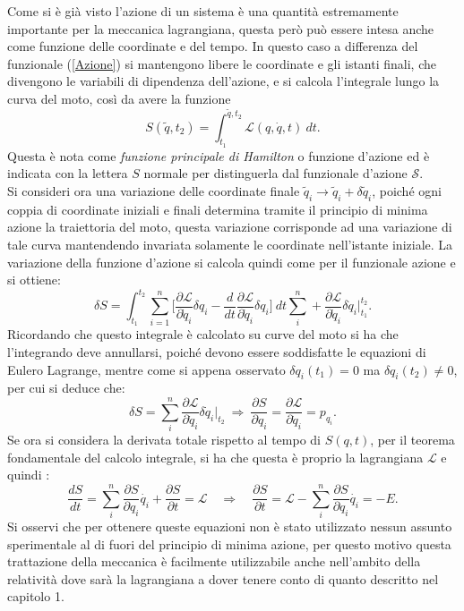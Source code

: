 Come si è già visto l'azione di un sistema è una quantità estremamente importante per la meccanica lagrangiana, questa però può essere intesa anche come funzione delle coordinate e del tempo. In questo caso a differenza del funzionale (\ref{Azione}) si mantengono libere le coordinate e gli istanti finali, che divengono le variabili di dipendenza dell'azione, e si calcola l'integrale lungo la curva del moto, così da avere la funzione
\begin{equation}
    S (\tilde q,t_2)=\int_{t_1}^{\tilde q,t_2} \mathcal{L} (q,\dot q,t)\ dt.
\end{equation}
Questa è nota come \emph{funzione principale di Hamilton} o funzione d'azione ed è indicata con la lettera $S$ normale per distinguerla dal funzionale d'azione $\mathcal{S} $.\\
Si consideri ora una variazione delle coordinate finale $\tilde q_i\rightarrow \tilde q_i+\delta \tilde q_i$, poiché ogni coppia di coordinate iniziali e finali determina tramite il principio di minima azione la traiettoria del moto, questa variazione corrisponde ad una variazione di tale curva mantendendo invariata solamente le coordinate nell'istante iniziale. La variazione della funzione d'azione si calcola quindi come per il funzionale azione e si ottiene:
\begin{equation*}
    \delta S=\int_{t_1}^{t_2}\sum_{i=1}^{n}\bigg[\frac{\partial\mathcal{L} }{\partial \dot  q_i}\delta q_i-\frac{d}{dt}\frac{\partial\mathcal{L} }{\partial \dot{q}_i}\delta q_i \bigg]\ dt\sum_i^n+\frac{\partial\mathcal{L} }{\partial \dot q_i}\delta \dot{q}_i\bigg|_{t_1}^{t_2}.
\end{equation*}
Ricordando che questo integrale è calcolato su curve del moto si ha che l'integrando deve annullarsi, poiché devono essere soddisfatte le equazioni di Eulero Lagrange, mentre come si appena osservato $\delta q_i(t_1)=0$ ma $\delta q_i(t_2)\neq0$, per cui si deduce che:
\begin{equation*}
    \delta S=\sum_i^n\frac{\partial\mathcal{L} }{\partial \dot q_i}\delta \dot{q}_i\bigg|_{t_2}\ \Rightarrow\ \frac{\partial S}{\partial q_i}= \frac{\partial\mathcal{L} }{\partial \dot q_i}=p_{q_i}.
\end{equation*}
Se ora si considera la derivata totale rispetto al tempo di $S(q,t)$, per il teorema fondamentale del calcolo integrale, si ha che questa è proprio la lagrangiana $\mathcal{L} $ e quindi :
\begin{equation*}
    \frac{dS}{dt}=\sum_i^n\frac{\partial S }{\partial  q_i}\dot{q_i}+\frac{\partial S }{\partial t}=\mathcal{L}\quad \Rightarrow\quad \frac{\partial S }{\partial t}=\mathcal{L} -\sum_i^n\frac{\partial S }{\partial  q_i}\dot{q_i}=-E.
\end{equation*}
Si osservi che per ottenere queste equazioni non è stato utilizzato nessun assunto sperimentale al di fuori del principio di minima azione, per questo motivo questa trattazione della meccanica è facilmente utilizzabile anche nell'ambito della relatività dove sarà la lagrangiana a dover tenere conto di quanto descritto nel capitolo 1.